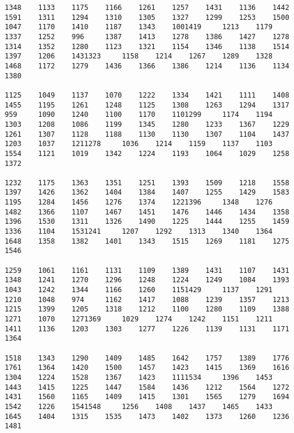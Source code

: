 \begin{verbatim}
1348    1133    1175    1166    1261    1257    1431    1136    1442    1591    1311    1294    1310    1305    1327    1299    1253    1500    1047    1170    1410    1187    1343    1001419     1213    1179    1337    1252    996     1387    1413    1278    1386    1427    1278    1314    1352    1280    1123    1321    1154    1346    1138    1514    1397    1206    1431323     1158    1214    1267    1289    1328    1468    1172    1279    1436    1366    1386    1214    1136    1134    1380

1125    1049    1137    1070    1222    1334    1421    1111    1408    1455    1195    1261    1248    1125    1308    1263    1294    1317    959     1090    1240    1100    1170    1101299     1174    1194    1303    1208    1086    1199    1345    1280    1233    1367    1229    1261    1307    1128    1188    1130    1130    1307    1104    1437    1203    1037    1211278     1036    1214    1159    1137    1103    1554    1121    1019    1342    1224    1193    1064    1029    1258    1372

1232    1175    1363    1351    1251    1393    1509    1218    1558    1397    1426    1362    1404    1384    1407    1255    1429    1583    1195    1284    1456    1276    1374    1221396     1348    1276    1482    1366    1107    1467    1451    1476    1446    1434    1358    1396    1530    1311    1326    1490    1225    1444    1255    1459    1336    1104    1531241     1207    1292    1313    1340    1364    1648    1358    1382    1401    1343    1515    1269    1181    1275    1546

1259    1061    1161    1131    1109    1389    1431    1107    1431    1348    1241    1270    1296    1248    1224    1249    1084    1393    1043    1242    1344    1166    1260    1151429     1137    1291    1210    1048    974     1162    1417    1088    1239    1357    1213    1215    1399    1205    1318    1212    1100    1280    1109    1388    1271    1070    1271369     1029    1274    1242    1151    1211    1411    1136    1203    1303    1277    1226    1139    1131    1171    1364

1518    1343    1290    1409    1485    1642    1757    1389    1776    1761    1364    1420    1500    1457    1423    1415    1369    1616    1304    1224    1528    1367    1423    1111534     1396    1453    1443    1415    1225    1447    1584    1436    1212    1564    1272    1431    1560    1165    1409    1415    1301    1565    1279    1694    1542    1226    1541548     1256    1408    1437    1465    1433    1645    1404    1315    1535    1473    1402    1373    1260    1236    1481


\end{verbatim}
